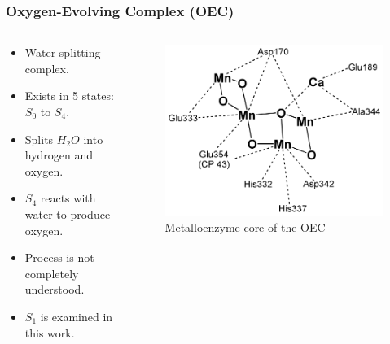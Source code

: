 \documentclass[10pt]{beamer}
\begin{document}
\begin{frame}
	\frametitle{Oxygen-Evolving Complex (OEC)}

	\begin{columns}[T]
		\begin{column}{.5\textwidth}
			\begin{itemize}
				\item Water-splitting complex.
				\item Exists in 5 states: $S_{0}$ to $S_{4}$.
				\item Splits $H_{2}O$ into hydrogen and oxygen.
				\item $S_{4}$ reacts with water to produce oxygen.
				\item Process is not completely understood.
				\item $S_{1}$ is examined in this work.
			\end{itemize}
		\end{column}
		\begin{column}{.5\textwidth}
			\begin{figure}
				\caption{Metalloenzyme core of the OEC}
				\includegraphics[width=1.0\textwidth,natwidth=620,natheight=485]{img/oec.png}
			\end{figure}
		\end{column}
	\end{columns}

\end{frame}
\end{document}
